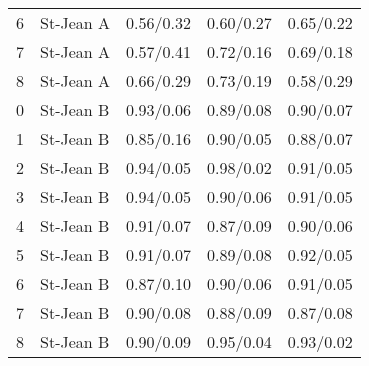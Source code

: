 \begin{table}[H]
\begin{tabular}{l l c c c}
    6 & St-Jean A & 0.56/0.32 & 0.60/0.27 & 0.65/0.22 \\
    7 & St-Jean A & 0.57/0.41 & 0.72/0.16 & 0.69/0.18 \\
    8 & St-Jean A & 0.66/0.29 & 0.73/0.19 & 0.58/0.29 \\
    0 & St-Jean B & 0.93/0.06 & 0.89/0.08 & 0.90/0.07 \\
    1 & St-Jean B & 0.85/0.16 & 0.90/0.05 & 0.88/0.07 \\
    2 & St-Jean B & 0.94/0.05 & 0.98/0.02 & 0.91/0.05 \\
    3 & St-Jean B & 0.94/0.05 & 0.90/0.06 & 0.91/0.05 \\
    4 & St-Jean B & 0.91/0.07 & 0.87/0.09 & 0.90/0.06 \\
    5 & St-Jean B & 0.91/0.07 & 0.89/0.08 & 0.92/0.05 \\
    6 & St-Jean B & 0.87/0.10 & 0.90/0.06 & 0.91/0.05 \\
    7 & St-Jean B & 0.90/0.08 & 0.88/0.09 & 0.87/0.08 \\
    8 & St-Jean B & 0.90/0.09 & 0.95/0.04 & 0.93/0.02 \\
    \bottomrule
  \end{tabular}
\end{table}


